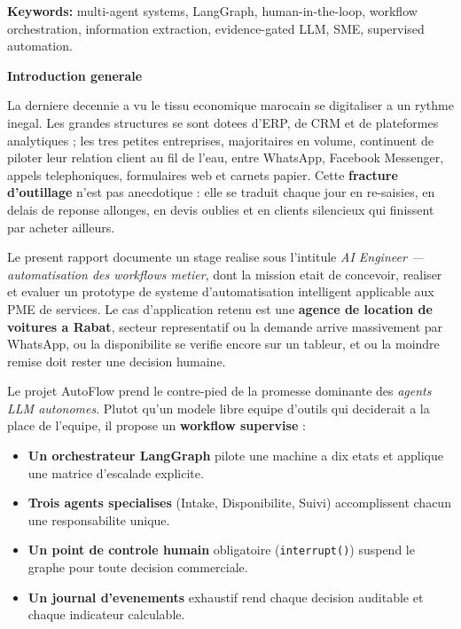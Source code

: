 \documentclass[12pt,a4paper,openany]{report}
\begin{document}
\noindent\textbf{Keywords:} multi-agent systems, LangGraph, human-in-the-loop, workflow orchestration, information extraction, evidence-gated LLM, SME, supervised automation.

\tableofcontents
\listoffigures
\listoftables

\cleardoublepage
{}

\vspace*{1cm}
{\noindent \Huge \bfseries \color{titleBlue} Introduction generale \par}
\vspace{1.2cm}

La derniere decennie a vu le tissu economique marocain se digitaliser a un rythme inegal. Les grandes structures se sont dotees d'ERP, de CRM et de plateformes analytiques ; les tres petites entreprises, majoritaires en volume, continuent de piloter leur relation client au fil de l'eau, entre WhatsApp, Facebook Messenger, appels telephoniques, formulaires web et carnets papier. Cette \textbf{fracture d'outillage} n'est pas anecdotique : elle se traduit chaque jour en re-saisies, en delais de reponse allonges, en devis oublies et en clients silencieux qui finissent par acheter ailleurs.

Le present rapport documente un stage realise sous l'intitule \emph{AI Engineer --- automatisation des workflows metier}, dont la mission etait de concevoir, realiser et evaluer un prototype de systeme d'automatisation intelligent applicable aux PME de services. Le cas d'application retenu est une \textbf{agence de location de voitures a Rabat}, secteur representatif ou la demande arrive massivement par WhatsApp, ou la disponibilite se verifie encore sur un tableur, et ou la moindre remise doit rester une decision humaine.

Le projet AutoFlow prend le contre-pied de la promesse dominante des \emph{agents LLM autonomes}. Plutot qu'un modele libre equipe d'outils qui deciderait a la place de l'equipe, il propose un \textbf{workflow supervise} :
\begin{itemize}
    \item[---] \textbf{Un orchestrateur LangGraph} pilote une machine a dix etats et applique une matrice d'escalade explicite.
    \item[---] \textbf{Trois agents specialises} (Intake, Disponibilite, Suivi) accomplissent chacun une responsabilite unique.
    \item[---] \textbf{Un point de controle humain} obligatoire (\texttt{interrupt()}) suspend le graphe pour toute decision commerciale.
    \item[---] \textbf{Un journal d'evenements} exhaustif rend chaque decision auditable et chaque indicateur calculable.
\end{itemize}
\end{document}
